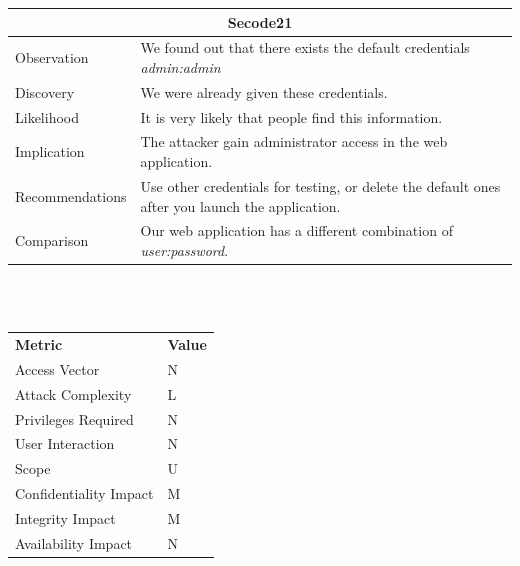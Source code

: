 \documentclass[headsepline,footsepline,footinclude=false,oneside,fontsize=11pt,paper=a4,listof=totoc,bibliography=totoc]{scrbook} %
\begin{document}
\begin{tabular}{ l|p{11cm}  }
	\hline
	\multicolumn{2}{c}{\textbf{Secode21}} \\
	\hline
	Observation   & We found out that there exists the default credentials \textit{admin:admin} \\
	Discovery  & We were already given these credentials.\\
	Likelihood & It is very likely that people find this information. \\
	Implication    & The attacker gain administrator access in the web application. \\
	Recommendations & Use other credentials for testing, or delete the default ones after you launch the application. \\
	Comparison & Our web application has a different combination of \textit{user:password}.\\
	\hline
\end{tabular}
\\
\vspace{0.5cm}
\\
\begin{center}
	\begin{tabular}{ll}
		\rowcolor[HTML]{34CDF9}
		{\color[HTML]{ECF4FF} \textbf{Metric}}        & {\color[HTML]{ECF4FF} \textbf{Value}} \\
		\rowcolor[HTML]{BBDAFF}
		{\color[HTML]{333333} Access Vector}          & {\color[HTML]{333333} } N              \\
		\rowcolor[HTML]{ECF4FF}
		{\color[HTML]{333333} Attack Complexity}      & {\color[HTML]{333333} } L              \\
		\rowcolor[HTML]{BBDAFF}
		{\color[HTML]{333333} Privileges Required}    & {\color[HTML]{333333} } N              \\
		\rowcolor[HTML]{ECF4FF}
		{\color[HTML]{333333} User Interaction}       & {\color[HTML]{333333} } N              \\
		\rowcolor[HTML]{BBDAFF}
		{\color[HTML]{333333} Scope}                  & {\color[HTML]{333333} } U              \\
		\rowcolor[HTML]{ECF4FF}
		{\color[HTML]{333333} Confidentiality Impact} & {\color[HTML]{333333} } M              \\
		\rowcolor[HTML]{BBDAFF}
		{\color[HTML]{333333} Integrity Impact}       & {\color[HTML]{333333} } M              \\
		\rowcolor[HTML]{ECF4FF}
		{\color[HTML]{333333} Availability Impact}    & {\color[HTML]{333333} } N
	\end{tabular}
\end{center}
\end{document}
